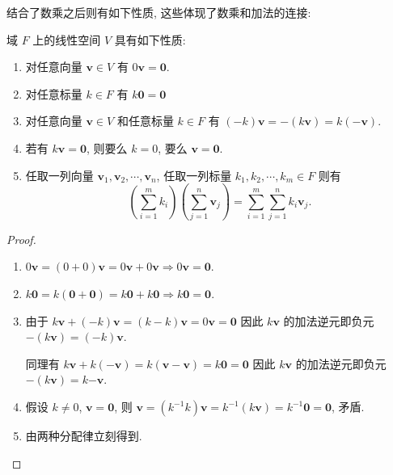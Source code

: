 \documentclass[UTF8]{book}
\begin{document}
结合了数乘之后则有如下性质, 这些体现了数乘和加法的连接: 
\begin{proposition}
    域 $F$ 上的线性空间 $V$ 具有如下性质: 
    \begin{enumerate}[(1)]
        \item 对任意向量 $\boldsymbol{v}\in V$ 有 
        $0\boldsymbol{v} = \boldsymbol{0}$.
        \item 对任意标量 $k \in F$ 有 
        $ k\boldsymbol{0} = \boldsymbol{0} $
        \item 对任意向量 $\boldsymbol{v}\in V$ 和任意标量 $k\in F$ 有
        $ (-k)\boldsymbol{v} =-(k\boldsymbol{v}) = k(\boldsymbol{-v}) $.
        \item 若有 $k\boldsymbol{v} = \boldsymbol{0}$, 
        则要么 $k=0$, 要么 $\boldsymbol{v} = \boldsymbol{0}$. 
        \item 任取一列向量 
        $\boldsymbol{v}_1,\boldsymbol{v}_2,\cdots,\boldsymbol{v}_n$, 
        任取一列标量 
        $k_1,k_2,\cdots,k_m \in F$ 
        则有 
        $$ \left(\sum_{i=1}^{m} k_i\right)
        \left(\sum_{j=1}^{n}\boldsymbol{v}_j\right)
        = \sum_{i=1}^{m}\sum_{j=1}^{n} k_i \boldsymbol{v}_j. $$
    \end{enumerate}
\end{proposition}

\begin{proof}
    \begin{enumerate}[(1)]
        \item $ 0\boldsymbol{v} = (0+0)\boldsymbol{v} = 
        0\boldsymbol{v} + 0\boldsymbol{v} \Rightarrow 
        0\boldsymbol{v} = \boldsymbol{0} $. 
        \item $ k\boldsymbol{0} = k(\boldsymbol{0}+\boldsymbol{0}) = 
        k\boldsymbol{0} + k\boldsymbol{0} \Rightarrow 
        k\boldsymbol{0} = \boldsymbol{0} $.
        \item 由于 $ k\boldsymbol{v} + (-k)\boldsymbol{v} = 
        (k-k)\boldsymbol{v} = 0\boldsymbol{v} = \boldsymbol{0}$ 
        因此 $k\boldsymbol{v}$ 的加法逆元即负元 
        $-(k\boldsymbol{v}) = (-k)\boldsymbol{v}$. 

        同理有 $ k\boldsymbol{v} + k(-\boldsymbol{v}) = 
        k(\boldsymbol{v}-\boldsymbol{v}) = k\boldsymbol{0} 
        = \boldsymbol{0}$ 
        因此 $k\boldsymbol{v}$ 的加法逆元即负元 
        $-(k\boldsymbol{v}) = k\boldsymbol{-v}$. 
        
        \item 假设 $k\neq 0$, $\boldsymbol{v} = \boldsymbol{0}$, 
        则 
        $\boldsymbol{v} = (k^{-1}k)\boldsymbol{v} = k^{-1}
        (k\boldsymbol{v}) = k^{-1}\boldsymbol{0} = \boldsymbol{0}$, 
        矛盾. 
        
        \item 由两种分配律立刻得到. 
    \end{enumerate}
\end{proof}
\end{document}
